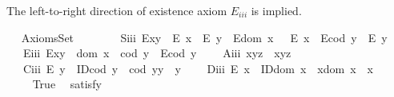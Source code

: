 \begin{isabellebody}
\begin{isamarkuptext}
      The left-to-right direction of existence axiom $E_{iii}$ is implied.%
\end{isamarkuptext}\isamarkuptrue%
\ \isamarkupfalse%
\ AxiomsSet{}\ {\isacharequal}\ \isanewline
\ \ \isanewline
\ \ \ S\isactrlsub i\isactrlsub i\isactrlsub i{\isacharcolon}\ {\isachardoublequoteopen}{\isacharparenleft}E{\isacharparenleft}x{\isasymcdot}y{\isacharparenright}\ \isactrlbold {\isasymrightarrow}\ {\isacharparenleft}E\ x\ \isactrlbold {\isasymand}\ E\ y{\isacharparenright}{\isacharparenright}\ \isactrlbold {\isasymand}\ {\isacharparenleft}E{\isacharparenleft}dom\ x\ {\isacharparenright}\ \isactrlbold {\isasymrightarrow}\ E\ x{\isacharparenright}\ \isactrlbold {\isasymand}\ {\isacharparenleft}E{\isacharparenleft}cod\ y{\isacharparenright}\ \isactrlbold {\isasymrightarrow}\ E\ y{\isacharparenright}{\isachardoublequoteclose}\ \ \isanewline
\ \ \ E\isactrlsub i\isactrlsub i\isactrlsub i{\isacharcolon}\ {\isachardoublequoteopen}E{\isacharparenleft}x{\isasymcdot}y{\isacharparenright}\ \isactrlbold {\isasymleftarrow}\ {\isacharparenleft}dom\ x\ {\isasymcong}\ cod\ y\ \isactrlbold {\isasymand}\ E{\isacharparenleft}cod\ y{\isacharparenright}{\isacharparenright}{\isachardoublequoteclose}\ \isanewline
\ \ \ A\isactrlsub i\isactrlsub i\isactrlsub i{\isacharcolon}\ {\isachardoublequoteopen}x{\isasymcdot}{\isacharparenleft}y{\isasymcdot}z{\isacharparenright}\ {\isasymcong}\ {\isacharparenleft}x{\isasymcdot}y{\isacharparenright}{\isasymcdot}z{\isachardoublequoteclose}\ \isanewline
\ \ \ C\isactrlsub i\isactrlsub i\isactrlsub i{\isacharcolon}\ {\isachardoublequoteopen}E\ y\ \isactrlbold {\isasymrightarrow}\ {\isacharparenleft}ID{\isacharparenleft}cod\ y{\isacharparenright}\ \isactrlbold {\isasymand}\ {\isacharparenleft}cod\ y{\isacharparenright}{\isasymcdot}y\ {\isasymcong}\ y{\isacharparenright}{\isachardoublequoteclose}\ \isanewline
\ \ \ D\isactrlsub i\isactrlsub i\isactrlsub i{\isacharcolon}\ {\isachardoublequoteopen}E\ x\ \isactrlbold {\isasymrightarrow}\ {\isacharparenleft}ID{\isacharparenleft}dom\ x{\isacharparenright}\ \isactrlbold {\isasymand}\ x{\isasymcdot}{\isacharparenleft}dom\ x{\isacharparenright}\ {\isasymcong}\ x{\isacharparenright}{\isachardoublequoteclose}\ \isanewline
\ \ \isanewline
\ \ \ \isamarkupfalse%
\ True\ \isamarkupfalse%
\ {\isacharbrackleft}satisfy{\isacharbrackright}%
\isadelimproof
\ %
\endisadelimproof
%
\isatagproof
{}\isamarkupfalse%

\end{isabellebody}

